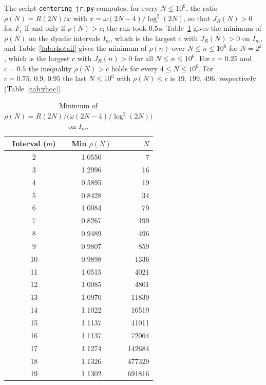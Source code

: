 \documentclass[11pt]{amsart}
\theoremstyle{definition}
\theoremstyle{remark}
\begin{document}
The script \texttt{centering\_jr.py} computes, for every $N\leq 10^6$, the ratio $\rho(N)=R(2N)/x$ with $x=\omega(2N-4)/\log^2(2N)$, so that $J_R(N)>0$ for $F_c$ if and only if $\rho(N)>c$; the run took $0.5$\,s. Table~\ref{tab:rho} gives the minimum of $\rho(N)$ on the dyadic intervals $I_m$, which is the largest $c$ with $J_R(N)>0$ on $I_m$, and Table~\ref{tab:rhotail} gives the minimum of $\rho(n)$ over $N\leq n\leq 10^6$ for $N=2^k$, which is the largest $c$ with $J_R(n)>0$ for all $N\leq n\leq 10^6$. For $c=0.25$ and $c=0.5$ the inequality $\rho(N)>c$ holds for every $4\leq N\leq 10^6$. For $c=0.75,\,0.9,\,0.95$ the last $N\leq 10^6$ with $\rho(N)\leq c$ is $19,\,199,\,496$, respectively (Table~\ref{tab:rhoc}).
\begin{table}[H]
\caption{Minimum of $\rho(N)=R(2N)/\bigl(\omega(2N-4)/\log^2(2N)\bigr)$ on $I_m$.}
\label{tab:rho}
\small
\begin{tabularx}{\textwidth}{ccr}
\hline
\textbf{Interval ($m$)} & \textbf{Min $\rho(N)$} & \textbf{$N$} \\
\hline
2 & 1.0550 & 7 \\
3 & 1.2996 & 16 \\
4 & 0.5895 & 19 \\
5 & 0.8428 & 34 \\
6 & 1.0084 & 79 \\
7 & 0.8267 & 199 \\
8 & 0.9489 & 496 \\
9 & 0.9807 & 859 \\
10 & 0.9898 & 1336 \\
11 & 1.0515 & 4021 \\
12 & 1.0085 & 4801 \\
13 & 1.0970 & 11839 \\
14 & 1.1022 & 16519 \\
15 & 1.1137 & 41011 \\
16 & 1.1137 & 72064 \\
17 & 1.1274 & 142684 \\
18 & 1.1326 & 477329 \\
19 & 1.1302 & 691816 \\
\hline
\end{tabularx}
\end{table}
\end{document}
